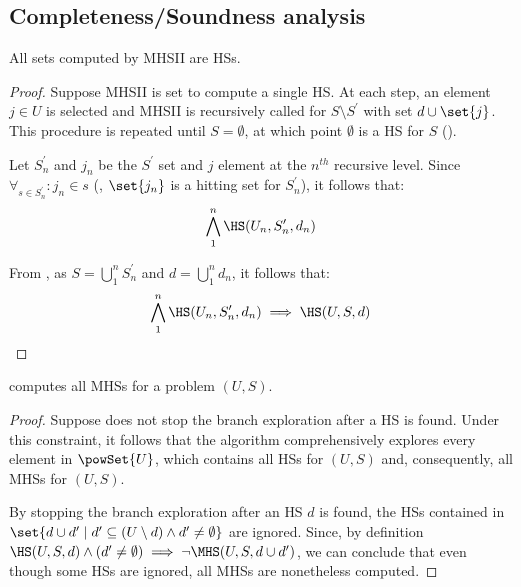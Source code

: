 \subsection{Completeness/Soundness analysis}
\label{sec:mhs2o:analysis:soundcomplete}
\begin{lemma}
  All sets computed by \ac{MHSII} are \acp{HS}.
\end{lemma}
\begin{proof}
  Suppose \ac{MHSII} is set to compute a single \ac{HS}.
  At each step, an element $j \in U$ is selected and \ac{MHSII} is
  recursively called for $S \setminus S^\prime$ with set $d \cup \set{j}$.
  This procedure is repeated until $S = \emptyset$, at which point
  $\emptyset$ is a \ac{HS} for $S$ ().

  Let $S^\prime_n$ and $j_n$ be the $S^\prime$ set and $j$ element at the $n^{th}$
  recursive level.  Since $\forall_{s \in S_n^\prime} : j_n \in s$ (\ie,
  $\set{j_n}$ is a hitting set for $S_n^\prime$), it follows that:
  \begin{equation}
    \bigwedge_1^n  \HS(U_n,S^\prime_n,d_n)
  \end{equation}

  From , as
  $S = \bigcup_1^n S_n^\prime$ and $d = \bigcup_1^n d_n$, it follows that:
  \begin{equation}
    \bigwedge_1^n  \HS(U_n,S^\prime_n,d_n) \implies \HS(U, S, d)
  \end{equation}
\end{proof}

\begin{lemma}[Completeness]
  \label{lem:mhs2o:completeness}
  \staccato{} computes all \acp{MHS} for a problem $(U,S)$.
\end{lemma}
\begin{proof}
  Suppose \staccato{} does not stop the branch exploration after a
  \ac{HS} is found.
  Under this constraint, it follows that the algorithm comprehensively
  explores every element in $\powSet{U}$, which contains all
  \acp{HS} for $(U,S)$ and, consequently, all \acp{MHS} for $(U,S)$.

  By stopping the branch exploration after an \ac{HS} $d$
  is found, the \acp{HS} contained in
  $\set{d \cup d^\prime \mid d^\prime \subseteq (U\setminus d) \wedge
    d^\prime \not= \emptyset}$ are ignored.
  Since, by definition $\HS(U,S,d) \wedge (d^\prime \not= \emptyset)
  \implies \neg\MHS(U,S,d \cup d^\prime)$, we can conclude that even
  though some \acp{HS} are ignored, all \acp{MHS} are nonetheless
  computed.
\end{proof}

